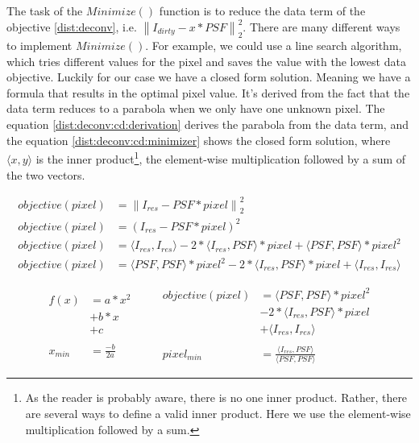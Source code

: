 The task of the $Minimize()$ function is to reduce the data term of the objective \eqref{dist:deconv}, i.e. $\left \| I_{dirty} - x * PSF \right \|_2^2$. There are many different ways to implement $Minimize()$. For example,  we could use a line search algorithm, which tries different values for the pixel and saves the value with the lowest data objective. Luckily for our case we have a closed form solution. Meaning we have a formula that results in the optimal pixel value. It's derived from the fact that the data term reduces to a parabola when we only have one unknown pixel. The equation \eqref{dist:deconv:cd:derivation} derives the parabola from the data term, and the equation \eqref{dist:deconv:cd:minimizer} shows the closed form solution, where $\langle x, y\rangle$ is the inner product\footnote{As the reader is probably aware, there is no one inner product. Rather, there are several ways to define a valid inner product. Here we use the element-wise multiplication followed by a sum.}, the element-wise multiplication followed by a sum of the two vectors.

\begin{equation} \label{dist:deconv:cd:derivation}
\begin{split}
objective(pixel) & = \left \| I_{res} - PSF * pixel \right \|_2^2\\
objective(pixel) & = (I_{res} - PSF * pixel)^2\\
objective(pixel) & = \langle I_{res}, I_{res} \rangle - 2*\langle I_{res},PSF\rangle * pixel + \langle PSF, PSF \rangle * pixel^2\\
objective(pixel) & = \langle PSF, PSF \rangle * pixel^2 - 2*\langle I_{res},PSF\rangle * pixel + \langle I_{res}, I_{res} \rangle
\end{split}
\end{equation}

\begin{equation} \label{dist:deconv:cd:minimizer}
\begin{split}
f(x) & = a*x^2 \\
 & + b*x \\
 & + c\\
 \\
x_{min} & = \frac{-b}{2a}
\end{split}
\quad \quad
\begin{split}
objective(pixel) & = \langle PSF, PSF \rangle * pixel^2 \\
 & - 2*\langle I_{res},PSF\rangle * pixel \\
 &+ \langle I_{res}, I_{res} \rangle\\
 \\
pixel_{min} & = \frac{\langle I_{res},PSF\rangle}{\langle PSF, PSF \rangle}
\end{split}
\end{equation}

